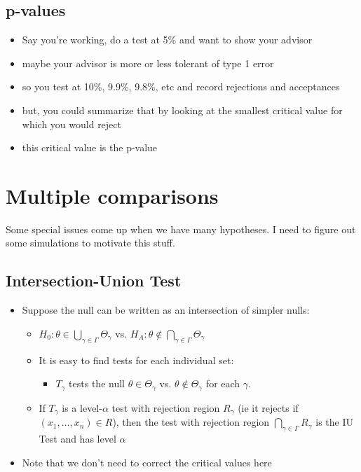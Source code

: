 \subsection{p-values}
\label{sec-2-5}

\begin{itemize}
\item Say you're working, do a test at 5\% and want to show your advisor
\item maybe your advisor is more or less tolerant of type 1 error
\item so you test at 10\%, 9.9\%, 9.8\%, etc and record rejections and acceptances
\item but, you could summarize that by looking at the smallest critical value for which you would reject
\item this critical value is the p-value
\end{itemize}
\section{Multiple comparisons}
\label{sec-3}

    Some special issues come up when we have many hypotheses.  I need
    to figure out some simulations to motivate this stuff.
\subsection{Intersection-Union Test}
\label{sec-3-1}

\begin{itemize}
\item Suppose the null can be written as an intersection of simpler nulls:
\begin{itemize}
\item $H_0: \theta \in \bigcup_{\gamma \in \Gamma} \Theta_\gamma$ vs. 
         $H_A: \theta \notin \bigcap_{\gamma \in \Gamma} \Theta_\gamma$
\item It is easy to find tests for each individual set:
\begin{itemize}
\item $T_\gamma$ tests the null $\theta \in \Theta_\gamma$
           vs. $\theta \notin \Theta_\gamma$ for each $\gamma$.
\end{itemize}
\item If $T_\gamma$ is a level-$\alpha$ test with rejection region
         $R_\gamma$ (ie it rejects if $(x_1,\dots,x_n) \in R$), then
         the test with rejection region $\bigcap_{\gamma \in \Gamma}
         R_\gamma$ is the IU Test and has level $\alpha$
\end{itemize}
\item Note that we don't need to correct the critical values here
\end{itemize}
